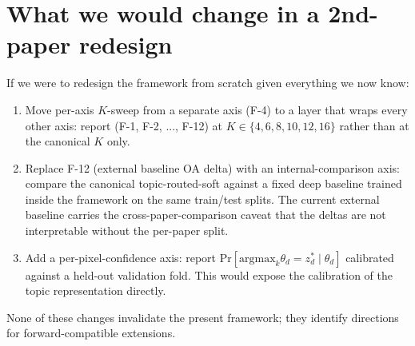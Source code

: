 \documentclass[11pt,a4paper]{article}
\begin{document}
\section{What we would change in a 2nd-paper redesign}

If we were to redesign the framework from scratch given everything
we now know:

\begin{enumerate}
\item Move per-axis $K$-sweep from a separate axis (F-4) to a layer
that wraps every other axis: report (F-1, F-2, ..., F-12) at
$K \in \{4, 6, 8, 10, 12, 16\}$ rather than at the canonical $K$
only.
\item Replace F-12 (external baseline OA delta) with an
internal-comparison axis: compare the canonical topic-routed-soft
against a fixed deep baseline trained inside the framework on the
same train/test splits. The current external baseline carries the
cross-paper-comparison caveat that the deltas are not interpretable
without the per-paper split.
\item Add a per-pixel-confidence axis: report
$\mathrm{Pr}[\text{argmax}_k \theta_d = z_d^* \mid \theta_d]$
calibrated against a held-out validation fold. This would expose
the calibration of the topic representation directly.
\end{enumerate}

None of these changes invalidate the present framework; they
identify directions for forward-compatible extensions.



\end{document}
